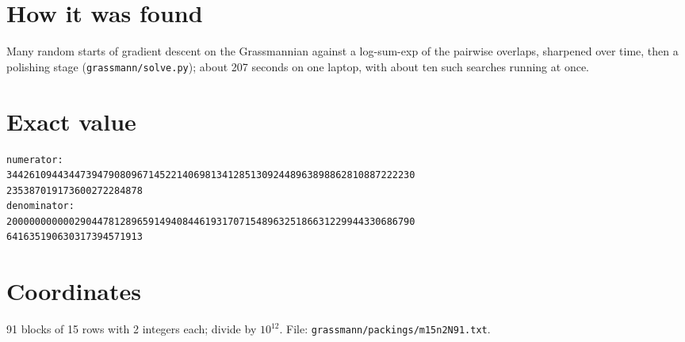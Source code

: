 \documentclass[11pt,a4paper]{article}
\begin{document}
\section{How it was found}
Many random starts of gradient descent on the Grassmannian against a log-sum-exp of the pairwise overlaps, sharpened over time, then a polishing stage (\texttt{grassmann/solve.py}); about 207 seconds on one laptop, with about ten such searches running at once.


\appendix
\section{Exact value}
{\small
\begin{verbatim}
numerator:
344261094434473947908096714522140698134128513092448963898862810887222230
235387019173600272284878
denominator:
200000000000290447812896591494084461931707154896325186631229944330686790
641635190630317394571913
\end{verbatim}}

\section{Coordinates}
91 blocks of 15 rows with 2 integers each; divide by $10^{12}$. File: \texttt{grassmann/packings/m15n2N91.txt}.
{\tiny
\begin{multicols}{4}
\end{multicols}}
\end{document}
